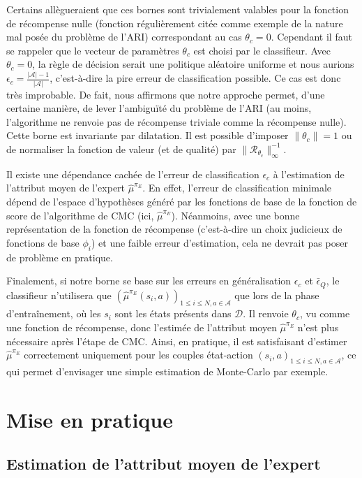 \documentclass[french,utf8]{./hermes-journal}
\newcommand{\R}{\mathcal{R}}
\newcommand{\A}{\mathcal{A}}
\newcommand{\D}{\mathcal{D}}
\begin{document}
Certains allègueraient que ces bornes sont trivialement valables pour la fonction de récompense nulle (fonction régulièrement citée comme exemple de la nature mal posée du problème de l'ARI) correspondant au cas $\theta_c=0$. Cependant il faut se rappeler que le vecteur de paramètres $\theta_c$ est choisi par le classifieur. Avec 
$\theta_c=0$, la règle de décision serait une politique aléatoire uniforme et nous aurions $\epsilon_c = \frac{|\A|-1}{|\A|}$, c'est-à-dire la pire erreur de classification possible. Ce cas est donc très improbable. De fait, nous affirmons que notre approche permet, d'une certaine manière, de lever l'ambiguïté du problème de l'ARI (au moins, l'algorithme ne renvoie pas de récompense triviale comme la récompense nulle).
%
Cette borne est invariante par dilatation. Il est possible d'imposer 
$\|\theta_c\|=1$ ou de normaliser la fonction de valeur (et de qualité) par 
$\|\R_{\theta_c}\|_\infty^{-1}$.

Il existe une dépendance cachée de l'erreur de classification  $\epsilon_c$ à l'estimation de l'attribut moyen de l'expert  $\hat{\mu}^{\pi_E}$. En effet, l'erreur de classification minimale dépend de l'espace d'hypothèses généré par les fonctions de base de la fonction de score de l'algorithme de CMC (ici, 
$\hat{\mu}^{\pi_E}$). Néanmoins, avec une bonne représentation de la fonction de récompense (c'est-à-dire un choix judicieux de fonctions de base $\phi_i$) et une faible erreur d'estimation, cela ne devrait pas poser de problème en pratique.

Finalement, si notre borne se base sur les erreurs en généralisation 
$\epsilon_c$ et $\bar{\epsilon}_Q$, le classifieur n'utilisera que 
$(\hat{\mu}^{\pi_E}(s_i,a))_{1\leq i\leq N,a\in\A}$ que lors de la phase d'entraînement, où les $s_i$ sont les états présents dans $\D$. Il renvoie 
$\theta_c$, vu comme une fonction de récompense, donc l'estimée de l'attribut moyen $\hat{\mu}^{\pi_E}$ n'est plus nécessaire après l'étape de CMC. Ainsi, en pratique, il est satisfaisant d'estimer 
$\hat{\mu}^{\pi_E}$ correctement uniquement pour les couples état-action $(s_i,a)_{1\leq i\leq
N,a\in\A}$, ce qui permet d'envisager une simple estimation de Monte-Carlo par exemple.

\section{Mise en pratique}
\label{seracticalApproach}

\subsection{Estimation de l'attribut moyen de l'expert}
\label{subseracticalApproacuE}
\end{document}
